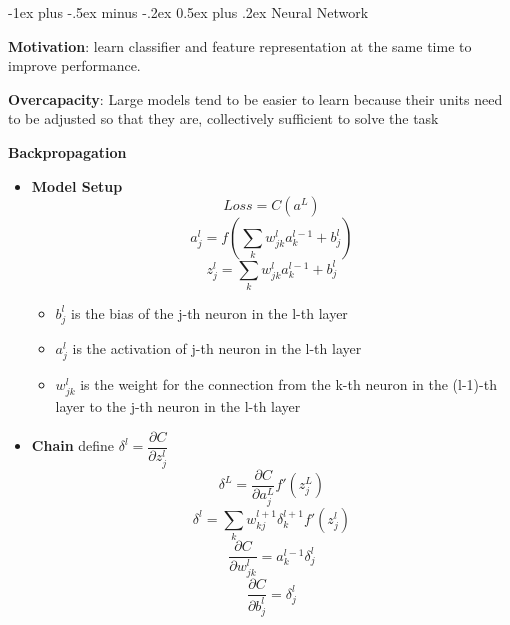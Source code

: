 \documentclass[a4paper, 10pt,landscape]{article}
\makeatletter
\renewcommand{\section}{\@startsection{section}{1}{0mm}%
                                {-1ex plus -.5ex minus -.2ex}%
                                {0.5ex plus .2ex}%
                                {\normalfont\large\bfseries}}
\makeatother
\begin{document}
\raggedright
\footnotesize
\begin{multicols*}{3}

\setlength{\premulticols}{1pt}
\setlength{\postmulticols}{1pt}
\setlength{\multicolsep}{1pt}
\setlength{\columnsep}{2pt}


\section{Neural Network}
\begin{description}
	\item {\bf Motivation}: learn classifier and feature representation at the same time to improve performance. 
	\item {\bf Overcapacity}: Large models tend to be easier to learn because their units need to be adjusted so that they are, collectively sufficient to solve the task
	\item {\bf Backpropagation}~
		\begin{itemize}
			\item {\bf Model Setup}~
				$$Loss = C(a^L)$$
				$$a_j^l = f(\sum_k w_{jk}^l a_k^{l-1} + b_j^l)$$
				$$z_j^{l} = \sum_k w_{jk}^{l} a_k^{l-1} + b_j^l$$
					\begin{itemize}
						\item $b_j^l$ is the bias of the j-th neuron in the l-th layer
						\item $a_j^l$ is the activation of j-th neuron in the l-th layer
						\item $w_{jk}^l$ is the weight for the connection from the k-th neuron in the (l-1)-th layer to the j-th neuron in the l-th layer
					\end{itemize}
			\item {\bf Chain} define $\delta^l = \dfrac{\partial C}{\partial z_j^l}$
				$$\delta^{L} = \dfrac{\partial C}{\partial a_j^L}f'(z_j^L)$$
				$$\delta^l = \sum_k w_{kj}^{l+1}\delta_k^{l+1}f'(z_j^l)$$
				$$\dfrac{\partial C}{\partial w_{jk}^l} = a_k^{l-1} \delta_j^l$$
				$$\dfrac{\partial C}{\partial b_j^l} = \delta_j^l$$

		\end{itemize}
\end{description}



\end{multicols*}
\end{document}
